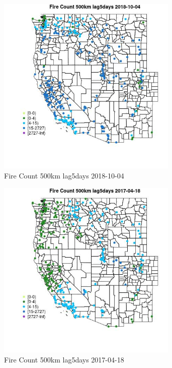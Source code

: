 \begin{figure} 
\centering  
\includegraphics[width=0.77\textwidth]{Code_Outputs/Report_ML_input_PM25_Step4_part_f_de_duplicated_aves_prioritize_24hr_obswNAs_MapObsFire_Count_500km_lag5days2018-10-04.jpg} 
\caption{\label{fig:Report_ML_input_PM25_Step4_part_f_de_duplicated_aves_prioritize_24hr_obswNAsMapObsFire_Count_500km_lag5days2018-10-04}Fire Count 500km lag5days 2018-10-04} 
\end{figure} 
 

\clearpage 

\begin{figure} 
\centering  
\includegraphics[width=0.77\textwidth]{Code_Outputs/Report_ML_input_PM25_Step4_part_f_de_duplicated_aves_prioritize_24hr_obswNAs_MapObsFire_Count_500km_lag5days2017-04-18.jpg} 
\caption{\label{fig:Report_ML_input_PM25_Step4_part_f_de_duplicated_aves_prioritize_24hr_obswNAsMapObsFire_Count_500km_lag5days2017-04-18}Fire Count 500km lag5days 2017-04-18} 
\end{figure} 
 

